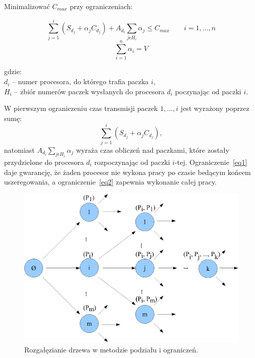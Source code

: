\vspace{5mm}\noindent
Minimalizować $C_{max}$ przy ograniczeniach:

\begin{equation}\label{eq1}
\sum\limits_{j=1}^{i} (S_{d_j} + \alpha_j C_{d_j}) 
                    + A_{d_i} \sum\limits_{j \epsilon H_i} \alpha_j \le C_{max}   \quad\quad i = 1, \ldots{}, n
\end{equation}
\begin{equation}\label{eq2}
\sum\limits_{i=1}^{n} \alpha_i = V
\end{equation}

\noindent gdzie:\\
$d{_i}$ -- numer procesora, do którego trafia paczka $i$,\\
$H{_i}$ -- zbiór numerów paczek wysłanych do procesora $d{_i}$ poczynając od paczki $i$.
\vspace{5mm}

W pierwszym ograniczeniu czas transmisji paczek $1, \ldots{}, i$ jest wyrażony poprzez sumę:
\begin{displaymath}
\sum\limits_{j=1}^i (S_{d_j} + \alpha_j C_{d_j}), \nonumber
\end{displaymath}
natomiast $A_{d_i} \sum\limits_{j \epsilon H_i} \alpha_j$ wyraża czas obliczeń nad paczkami, które zostały przydzielone do procesora $d{_i}$ 
rozpoczynając od paczki $i$-tej. Ograniczenie~\ref{eq1} daje gwarancję, że żaden procesor nie wykona pracy po czasie bedącym końcem uszeregowania, a 
ograniczenie~\ref{eq2} zapewnia wykonanie całej pracy.

\begin{figure}[t]
\centering\includegraphics[scale=0.5]{figures/bb1.pdf}
\caption{Rozgałęzianie drzewa w metodzie podziału i ograniczeń.}\label{rys:bb-cut}
\end{figure}

